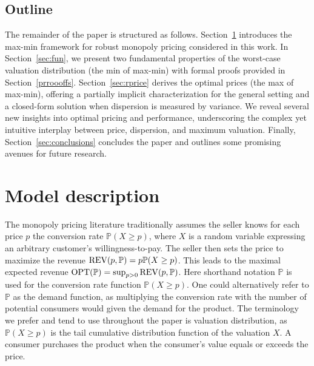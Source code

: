 \documentclass[11pt]{article}
\newcommand{\bP}{\mathbb{P}}
\newcommand{\1}{\mathds{1}}
\begin{document}
\subsection{Outline}
The remainder of the paper is structured as follows. Section~\ref{sec:model} introduces the max-min framework for robust monopoly pricing considered in this work. In Section~\ref{sec:fun}, we present two fundamental properties of the worst-case valuation distribution (the min of max-min) with formal proofs provided in Section~\ref{prroooffs}. Section~\ref{sec:rprice} derives the optimal prices (the max of max-min), offering a partially implicit characterization for the general setting and a closed-form solution when dispersion is measured by variance. We reveal several new insights into optimal pricing and performance, underscoring the complex yet intuitive interplay between price, dispersion, and maximum valuation. Finally, Section~\ref{sec:conclusions} concludes the paper and outlines some promising avenues for future research.

\section{Model description}\label{sec:model}
The monopoly pricing literature traditionally assumes the seller knows for each price $p$ the conversion rate $\bP(X \geq p)$, where $X$ is a random variable expressing an arbitrary customer's willingness-to-pay. The seller then sets the price to maximize the revenue $\textup{REV}(p,\bP)=p\bP(X \geq p)$. This leads to the maximal expected revenue $\textup{OPT}(\bP)=\sup_{p>0}\textup{REV}(p,\bP)$. Here shorthand notation $\bP$ is used for the conversion rate function $\bP(X \geq p)$. One could alternatively refer to $\bP$ as the demand function, as multiplying the conversion rate with the number of potential consumers would given the demand for the product. The terminology we prefer and tend to use throughout the paper is 
valuation distribution, as $\bP(X \geq p)$ is the tail cumulative distribution function of the valuation $X$. A consumer purchases the product when the consumer's value equals or exceeds the price. 
\end{document}

